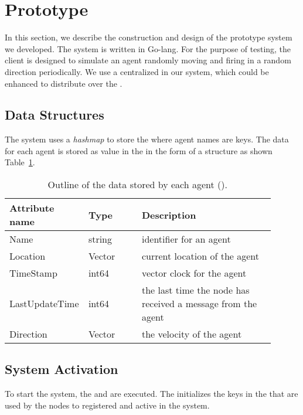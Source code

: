 \section{Prototype}
\label{sec:prototype}

	In this section, we describe the construction and design of the prototype system we developed. The system is written in Go-lang. For the purpose of testing, the client is designed to simulate an agent randomly moving and firing in a random direction periodically.
	We use a centralized \kvService in our system, which could be enhanced to distribute over the \localServer.
	
\subsection{Data Structures}

	The system uses a \emph{hashmap} to store the \gamestate where agent names are keys. The data for each agent is stored as value in the \gamestate in the form of a structure as shown Table~\ref{table:gamestate-struct}.


\begin{table}[htb]
	\centering
	\begin{tabular}{p{0.2\linewidth} | p{0.2\linewidth} | p{0.5\linewidth}}
		\textbf{Attribute name} & \textbf{Type} & \textbf{Description} \\ \hline
		Name & string & identifier for an agent\\ \hline
		Location & Vector & current location of the agent \\ \hline
		TimeStamp & int64  & vector clock for the agent \\  \hline
		LastUpdateTime & int64 & the last time the node has received a message from the agent\\ \hline
		Direction & Vector & the velocity of the agent\\ \hline	
	\end{tabular}
	\caption{\label{table:gamestate-struct} Outline of the data stored by each agent (\agentstate).}
\end{table}


\subsection{System Activation}

	To start the system, the \kvService and \activityServer are executed. The \activityServer initializes the keys in the \kvService that are used by the nodes to registered and active in the system. 
	
